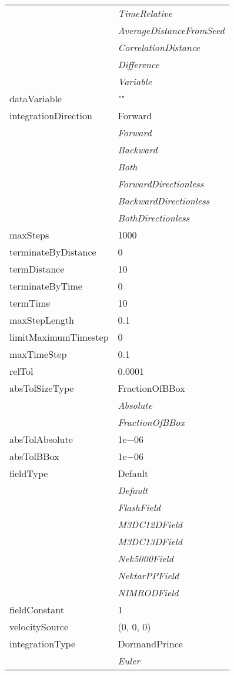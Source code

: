 \documentclass[10pt,a4paper]{report}
\begin{document}
\begin{longtable}{ll}
 & {\it  TimeRelative} \\
 & {\it  AverageDistanceFromSeed} \\
 & {\it  CorrelationDistance} \\
 & {\it  Difference} \\
 & {\it  Variable} \\
dataVariable  &  "" \\
integrationDirection  &  Forward   \\
 & {\it  Forward} \\
 & {\it  Backward} \\
 & {\it  Both} \\
 & {\it  ForwardDirectionless} \\
 & {\it  BackwardDirectionless} \\
 & {\it  BothDirectionless} \\
maxSteps  &  1000 \\
terminateByDistance  &  0 \\
termDistance  &  10 \\
terminateByTime  &  0 \\
termTime  &  10 \\
maxStepLength  &  0.1 \\
limitMaximumTimestep  &  0 \\
maxTimeStep  &  0.1 \\
relTol  &  0.0001 \\
absTolSizeType  &  FractionOfBBox   \\
 & {\it  Absolute} \\
 & {\it  FractionOfBBox} \\
absTolAbsolute  &  1e$-$06 \\
absTolBBox  &  1e$-$06 \\
fieldType  &  Default   \\
 & {\it  Default} \\
 & {\it  FlashField} \\
 & {\it  M3DC12DField} \\
 & {\it  M3DC13DField} \\
 & {\it  Nek5000Field} \\
 & {\it  NektarPPField} \\
 & {\it  NIMRODField} \\
fieldConstant  &  1 \\
velocitySource  &  (0, 0, 0) \\
integrationType  &  DormandPrince   \\
 & {\it  Euler} \\

\end{longtable}
\end{document}
